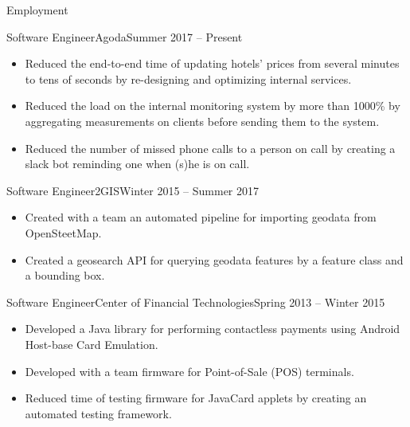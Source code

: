 \documentclass[]{cv}
\begin{document}
	\makeheader

	\begin{cvsection}{Employment}
		\begin{cvsubsection}{Software Engineer}{Agoda}{Summer 2017 -- Present}
			\begin{itemize}
				\item Reduced the end-to-end time of updating hotels' prices from several minutes to tens of seconds by re-designing and optimizing internal services.
				\item Reduced the load on the internal monitoring system by more than 1000\% by aggregating measurements on clients before sending them to the system.
        \item Reduced the number of missed phone calls to a person on call by creating a slack bot reminding one when (s)he is on call.
			\end{itemize}
		\end{cvsubsection}

		\begin{cvsubsection}{Software Engineer}{2GIS}{Winter 2015 -- Summer 2017}
			\begin{itemize}
				\item Created with a team an automated pipeline for importing geodata from OpenSteetMap.
				\item Created a geosearch API for querying geodata features by a feature class and a bounding box.
			\end{itemize}
		\end{cvsubsection}

		\begin{cvsubsection}{Software Engineer}{Center of Financial Technologies}{Spring 2013 -- Winter 2015}
			\begin{itemize}
        \item Developed a Java library for performing contactless payments using Android Host-base Card Emulation.
        \item Developed with a team firmware for Point-of-Sale (POS) terminals.
        \item Reduced time of testing firmware for JavaCard applets by creating an automated testing framework.
			\end{itemize}
		\end{cvsubsection}

	\end{cvsection}
\end{document}
